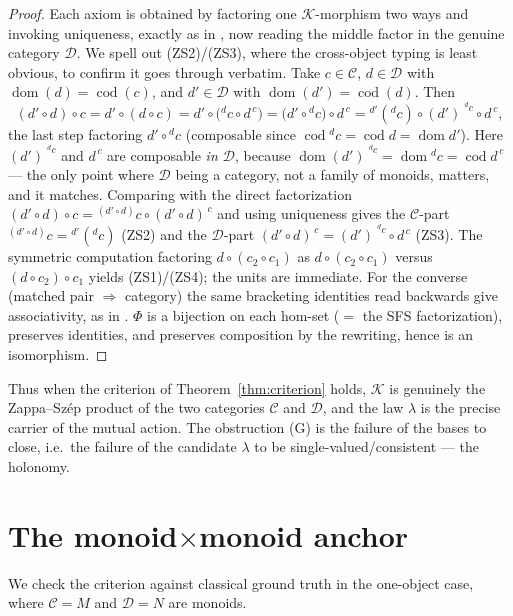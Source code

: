 \documentclass[11pt]{article}
\theoremstyle{definition}
\newcommand{\C}{\mathcal{C}}
\newcommand{\D}{\mathcal{D}}
\newcommand{\K}{\mathcal{K}}
\newcommand{\dom}{\operatorname{dom}}
\newcommand{\cod}{\operatorname{cod}}
\newcommand{\lact}[2]{{}^{#1}\!#2}      %
\newcommand{\rest}[2]{#1^{\,#2}}        %
\begin{document}
\begin{proof}
Each axiom is obtained by factoring one $\K$-morphism two ways and invoking
uniqueness, exactly as in \cite[Lem.~5]{single}, now reading the middle factor in
the genuine category $\D$. We spell out (ZS2)/(ZS3), where the cross-object
typing is least obvious, to confirm it goes through verbatim. Take $c\in\C$,
$d\in\D$ with $\dom(d)=\cod(c)$, and $d'\in\D$ with $\dom(d')=\cod(d)$. Then
\[
  (d'\circ d)\circ c
  = d'\circ(d\circ c)
  = d'\circ\bigl(\lact{d}{c}\circ\rest{d}{c}\bigr)
  = \bigl(d'\circ\lact{d}{c}\bigr)\circ\rest{d}{c}
  = \lact{d'}{(\lact{d}{c})}\circ\rest{(d')}{\,\lact{d}{c}}\circ\rest{d}{c},
\]
the last step factoring $d'\circ\lact{d}{c}$ (composable since
$\cod\lact{d}{c}=\cod d=\dom d'$). Here $\rest{(d')}{\,\lact{d}{c}}$ and
$\rest{d}{c}$ are composable \emph{in $\D$}, because
$\dom\rest{(d')}{\,\lact{d}{c}}=\dom\lact{d}{c}=\cod\rest{d}{c}$ --- the only
point where $\D$ being a category, not a family of monoids, matters, and it
matches. Comparing with the direct factorization $(d'\circ d)\circ
c=\lact{(d'\circ d)}{c}\circ\rest{(d'\circ d)}{c}$ and using uniqueness gives the
$\C$-part $\lact{(d'\circ d)}{c}=\lact{d'}{(\lact{d}{c})}$ (ZS2) and the $\D$-part
$\rest{(d'\circ d)}{c}=\rest{(d')}{\,\lact{d}{c}}\circ\rest{d}{c}$ (ZS3). The
symmetric computation factoring $d\circ(c_2\circ c_1)$ as $d\circ(c_2\circ c_1)$
versus $(d\circ c_2)\circ c_1$ yields (ZS1)/(ZS4); the units are immediate. For
the converse (matched pair $\Rightarrow$ category) the same bracketing identities
read backwards give associativity, as in \cite[Thm.~3]{single}. $\Phi$ is a
bijection on each hom-set ($=$ the SFS factorization), preserves identities, and
preserves composition by the rewriting, hence is an isomorphism.
\end{proof}

Thus when the criterion of Theorem~\ref{thm:criterion} holds, $\K$ is genuinely
the Zappa--Sz\'ep product of the two categories $\C$ and $\D$, and the law
$\lambda$ is the precise carrier of the mutual action. The obstruction (G) is the
failure of the bases to close, i.e.\ the failure of the candidate $\lambda$ to be
single-valued/consistent --- the holonomy.

\section{The monoid$\times$monoid anchor}\label{sec:monoid}

We check the criterion against classical ground truth in the one-object case,
where $\C=M$ and $\D=N$ are monoids.
\end{document}
